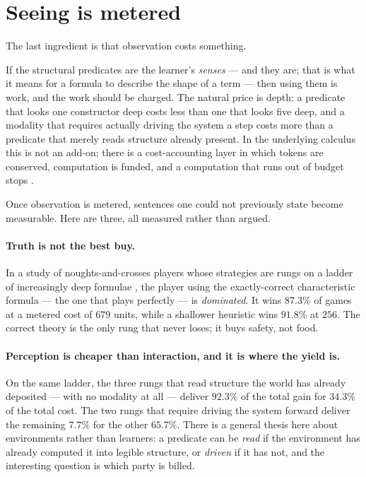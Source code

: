 \section{Seeing is metered}
\label{sec:0metered}

The last ingredient is that observation costs something.

If the structural predicates are the learner's \emph{senses} --- and they are;
that is what it means for a formula to describe the shape of a term --- then using
them is work, and the work should be charged. The natural price is depth: a
predicate that looks one constructor deep costs less than one that looks five
deep, and a modality that requires actually driving the system a step costs more
than a predicate that merely reads structure already present. In the underlying
calculus this is not an add-on; there is a cost-accounting layer in which tokens
are conserved, computation is funded, and a computation that runs out of budget
stops \cite{ScientistNote,GsltOmnibus}.

Once observation is metered, sentences one could not previously state become
measurable. Here are three, all measured rather than argued.

\paragraph{Truth is not the best buy.} In a study of noughts-and-crosses players
whose strategies are rungs on a ladder of increasingly deep formulae
\cite{GameNote}, the player using the exactly-correct characteristic formula ---
the one that plays perfectly --- is \emph{dominated}. It wins $87.3\%$ of games at
a metered cost of $679$ units, while a shallower heuristic wins $91.8\%$ at $256$.
The correct theory is the only rung that never loses; it buys safety, not food.

\paragraph{Perception is cheaper than interaction, and it is where the yield is.}
On the same ladder, the three rungs that read structure the world has already
deposited --- with no modality at all --- deliver $92.3\%$ of the total gain for
$34.3\%$ of the total cost. The two rungs that require driving the system forward
deliver the remaining $7.7\%$ for the other $65.7\%$. There is a general thesis
here about environments rather than learners: a predicate can be \emph{read} if
the environment has already computed it into legible structure, or \emph{driven}
if it has not, and the interesting question is which party is billed.

